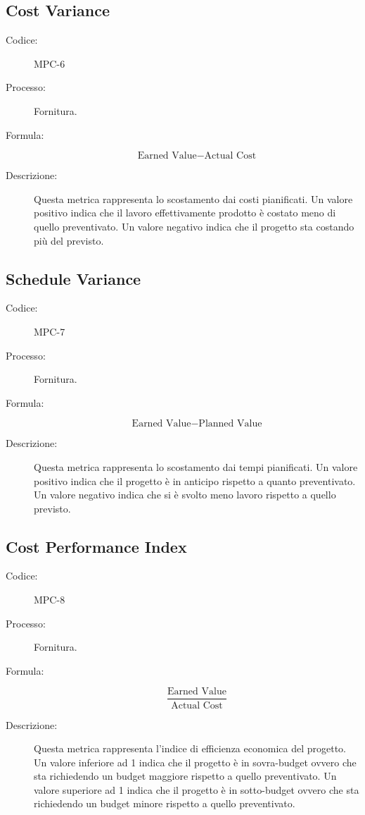 \subsection{Cost Variance}
\begin{description}
    \item[Codice:] MPC-6
    \item[Processo:] Fornitura.
    \item[Formula:] 
    \begin{equation}
        \text{Earned Value} - \text{Actual Cost}
    \end{equation}
    \item[Descrizione:] Questa metrica rappresenta lo scostamento dai costi pianificati. Un valore positivo indica che il lavoro effettivamente prodotto è costato meno di quello preventivato. Un valore negativo indica che il progetto sta costando più del previsto.
\end{description}

\subsection{Schedule Variance}
\begin{description}
    \item[Codice:] MPC-7
    \item[Processo:] Fornitura.
    \item[Formula:]
    \begin{equation}
        \text{Earned Value} - \text{Planned Value}
    \end{equation}
    \item[Descrizione:] Questa metrica rappresenta lo scostamento dai tempi pianificati. Un valore positivo indica che il progetto è in anticipo rispetto a quanto preventivato. Un valore negativo indica che si è svolto meno lavoro rispetto a quello previsto.
\end{description}

\subsection{Cost Performance Index}
\begin{description}
    \item[Codice:] MPC-8
    \item[Processo:] Fornitura.
    \item[Formula:]
    \begin{equation}
        \frac{\text{Earned Value}}{\text{Actual Cost}}
    \end{equation}
    \item[Descrizione:] Questa metrica rappresenta l'indice di efficienza economica del progetto. Un valore inferiore ad 1 indica che il progetto è in sovra-budget ovvero che sta richiedendo un budget maggiore rispetto a quello preventivato. Un valore superiore ad 1 indica che il progetto è in sotto-budget ovvero che sta richiedendo un budget minore rispetto a quello preventivato.
\end{description}

